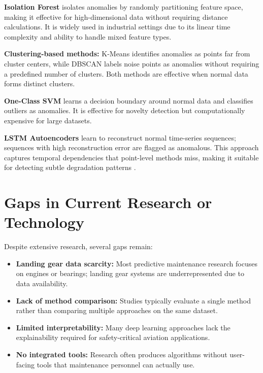\documentclass{CLS_zhou430}
\begin{document}
\textbf{Isolation Forest} \cite{liu2008isolation} isolates anomalies by randomly partitioning feature space, making it effective for high-dimensional data without requiring distance calculations. It is widely used in industrial settings due to its linear time complexity and ability to handle mixed feature types.

\textbf{Clustering-based methods:} K-Means identifies anomalies as points far from cluster centers, while DBSCAN \cite{ester1996density} labels noise points as anomalies without requiring a predefined number of clusters. Both methods are effective when normal data forms distinct clusters.

\textbf{One-Class SVM} \cite{scholkopf2001estimating} learns a decision boundary around normal data and classifies outliers as anomalies. It is effective for novelty detection but computationally expensive for large datasets.

\textbf{LSTM Autoencoders} \cite{malhotra2016lstm} learn to reconstruct normal time-series sequences; sequences with high reconstruction error are flagged as anomalous. This approach captures temporal dependencies that point-level methods miss, making it suitable for detecting subtle degradation patterns \cite{hochreiter1997long}.

\section{Gaps in Current Research or Technology}
Despite extensive research, several gaps remain:
\begin{itemize}
    \item \textbf{Landing gear data scarcity:} Most predictive maintenance research focuses on engines or bearings; landing gear systems are underrepresented due to data availability.
    \item \textbf{Lack of method comparison:} Studies typically evaluate a single method rather than comparing multiple approaches on the same dataset.
    \item \textbf{Limited interpretability:} Many deep learning approaches lack the explainability required for safety-critical aviation applications.
    \item \textbf{No integrated tools:} Research often produces algorithms without user-facing tools that maintenance personnel can actually use.
\end{itemize}
\end{document}
